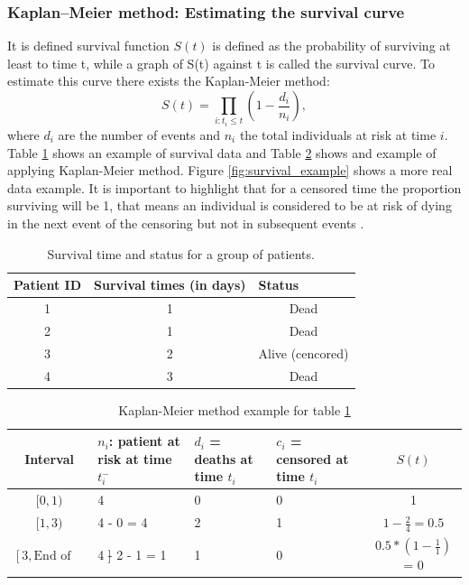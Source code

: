 \subsubsection{Kaplan–Meier method: Estimating the survival curve}

It is defined  survival function $S(t)$ is defined as the
probability of surviving at least to time t, while a
 graph of S(t) against t is called the survival curve.
To estimate this curve there exists the Kaplan-Meier method:
$$ S(t) = \prod_{i: t_i\leq t}\left(1 - \frac{d_i}{n_i}\right),$$
 where $d_{i}$ are the number of events and  $n_{i}$
the total individuals at risk at time $i$. Table \ref{survival-example} shows
an example of survival data and Table \ref{Kaplan-Meier-example} shows
and example of applying Kaplan-Meier method. Figure \ref{fig:survival_example}
shows a more real data example.
 It is important to highlight that
for a censored time the proportion surviving will be 1, that means
an individual is considered to be at risk of dying in the next event of the censoring
but not in subsequent events \cite{bland2004logrank}.

\begin{table}[h!]
\centering
\caption[Survival time example]{Survival time and status for a group of patients.}
\label{survival-example}
\begin{tabular}{ccc}
\hline
\multicolumn{1}{l}{\textbf{Patient ID}} & \multicolumn{1}{l}{\textbf{Survival times (in days)}} & \multicolumn{1}{l}{\textbf{Status}} \\ \hline
1 & 1 & Dead \\
2 & 1 & Dead \\
3 & 2 & Alive (cencored) \\
4 & 3 & Dead \\ \hline
\end{tabular}
\end{table}

\begin{table}[h!]
\centering
\caption[Kaplan-Meier method  example]{Kaplan-Meier method example for table \ref{survival-example}}
\label{Kaplan-Meier-example}
\begin{tabular}{cp{3cm}p{3cm}p{3cm}c}
\hline
\textbf{Interval} & \textbf{$n_i$: patient at risk at time $t_i^-$} &
\textbf{$d_i$ = deaths at time $t_i$} &
\textbf{$c_i$ = censored at time $t_i$} &  \textbf{$S(t)$}  \\ \hline
$[0,1)$ & 4          & 0 & 0 & 1 \\
$[1,3)$ & 4 - 0 = 4  & 2 & 1 & $1 - \frac{2}{4} = 0.5$ \\
$[3,\textrm{End of study}]$  & 4 - 2 - 1 = 1  & 1 & 0 & $0.5 * (1 - \frac{1}{1})$ = 0 \\ \hline
\end{tabular}
\end{table}


